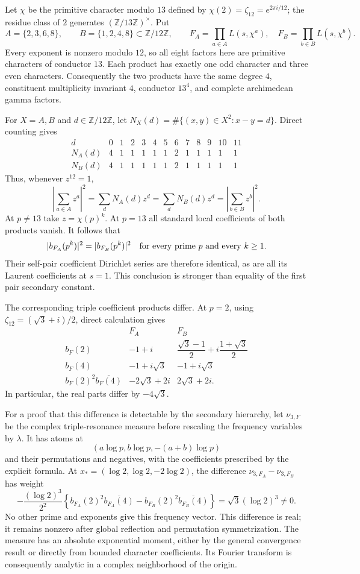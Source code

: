 \documentclass[11pt]{article}
\numberwithin{equation}{section}
\theoremstyle{remark}
\begin{document}
Let $\chi$ be the primitive character modulo $13$ defined by
$\chi(2)=\zeta_{12}=e^{2\pi i/12}$; the residue class of $2$ generates
$(\mathbb Z/13\mathbb Z)^\times$.  Put
\[
 A=\{2,3,6,8\},\qquad B=\{1,2,4,8\}\subset\mathbb Z/12\mathbb Z,
 \qquad
 F_A=\prod_{a\in A}L(s,\chi^a),\quad
 F_B=\prod_{b\in B}L(s,\chi^b).
\]
Every exponent is nonzero modulo $12$, so all eight factors here are
primitive characters of conductor $13$.  Each product has exactly one
odd character and three even characters.  Consequently the two products
have the same degree $4$, constituent multiplicity invariant $4$,
conductor $13^4$, and complete archimedean gamma factors.

For $X=A,B$ and $d\in\mathbb Z/12\mathbb Z$, let
$N_X(d)=\#\{(x,y)\in X^2:x-y=d\}$.  Direct counting gives
\[
\begin{array}{c|rrrrrrrrrrrr}
 d&0&1&2&3&4&5&6&7&8&9&10&11\\\hline
 N_A(d)&4&1&1&1&1&1&2&1&1&1&1&1\\
 N_B(d)&4&1&1&1&1&1&2&1&1&1&1&1
\end{array}
\]
Thus, whenever $z^{12}=1$,
\[
 \left|\sum_{a\in A}z^a\right|^2
 =\sum_dN_A(d)z^d
 =\sum_dN_B(d)z^d
 =\left|\sum_{b\in B}z^b\right|^2.
\]
At $p\ne13$ take $z=\chi(p)^k$.  At $p=13$ all standard local
coefficients of both products vanish.  It follows that
\[
 |b_{F_A}(p^k)|^2=|b_{F_B}(p^k)|^2
 \quad\hbox{for every prime $p$ and every $k\ge1$}.
\]
Their self-pair coefficient Dirichlet series are therefore identical,
as are all its Laurent coefficients at $s=1$.  This conclusion is
stronger than equality of the first pair secondary constant.

The corresponding triple coefficient products differ.  At $p=2$,
using $\zeta_{12}=(\sqrt3+i)/2$, direct calculation gives
\[
\begin{array}{c|cc}
 &F_A&F_B\\\hline
 b_F(2)&-1+i&\dfrac{\sqrt3-1}{2}
                       +i\dfrac{1+\sqrt3}{2}\\[5pt]
 b_F(4)&-1+i\sqrt3&-1+i\sqrt3\\[3pt]
 b_F(2)^2\overline{b_F(4)}&-2\sqrt3+2i&2\sqrt3+2i.
\end{array}
\]
In particular, the real parts differ by $-4\sqrt3$.

For a proof that this difference is detectable by the secondary
hierarchy, let $\nu_{3,F}$ be the complex triple-resonance measure before
rescaling the frequency variables by $\lambda$.  It has atoms at
\[
 (a\log p,b\log p,-(a+b)\log p)
\]
and their permutations and negatives, with the coefficients prescribed
by the explicit formula.  At
$x_*=(\log2,\log2,-2\log2)$, the difference
$\nu_{3,F_A}-\nu_{3,F_B}$ has weight
\[
 -\frac{(\log2)^3}{2^2}
 \left\{b_{F_A}(2)^2\overline{b_{F_A}(4)}
          -b_{F_B}(2)^2\overline{b_{F_B}(4)}\right\}
 =\sqrt3(\log2)^3\ne0.
\]
No other prime and exponents give this frequency vector.  This difference
is real; it remains nonzero after global reflection and permutation
symmetrization.  The measure has an absolute exponential moment, either
by the general convergence result or directly from bounded character
coefficients.  Its Fourier transform is consequently analytic in a
complex neighborhood of the origin.
\end{document}
